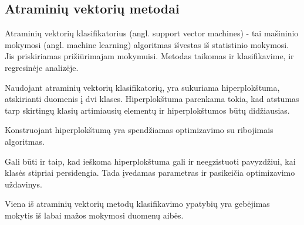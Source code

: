 \subsection{Atraminių vektorių metodai}

Atraminių vektorių klasifikatorius\cite{simkevicius06} (angl. support vector
machines) - tai mašininio mokymosi (angl. machine learning) algoritmas išvestas iš
statistinio mokymosi. Jis priskiriamas prižiūrimajam mokymuisi. Metodas taikomas
ir klasifikavime, ir regresinėje analizėje.

Naudojant atraminių vektorių klasifikatorių, yra sukuriama hiperplokštuma,
atskirianti duomenis į dvi klases. Hiperplokštuma parenkama tokia, kad atstumas
tarp skirtingų klasių artimiausių elementų ir hiperplokštumos būtų didžiausias.

Konstruojant hiperplokštumą yra spendžiamas optimizavimo su ribojimais
algoritmas.


Gali būti ir taip, kad ieškoma hiperplokštuma gali ir neegzistuoti pavyzdžiui,
kai klasės stipriai persidengia. Tada įvedamas parametras ir pasikeičia
optimizavimo uždavinys. %




Viena iš atraminių vektorių metodų klasifikavimo ypatybių yra gebėjimas mokytis
iš labai mažos mokymosi duomenų aibės.
